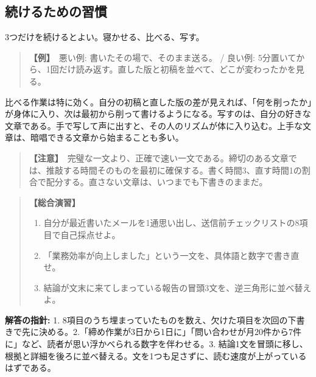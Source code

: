 \documentclass{article}
\begin{document}
\subsection{続けるための習慣}

3つだけを続けるとよい。寝かせる、比べる、写す。

\begin{quote}
\textbf{【例】}\ 悪い例: 書いたその場で、そのまま送る。 / 良い例: 5分置いてから、1回だけ読み返す。直した版と初稿を並べて、どこが変わったかを見る。
\end{quote}

比べる作業は特に効く。自分の初稿と直した版の差が見えれば、「何を削ったか」が身体に入り、次は最初から削って書けるようになる。写すのは、自分の好きな文章である。手で写して声に出すと、その人のリズムが体に入り込む。上手な文章は、暗唱できる文章から始まることも多い。

\begin{quote}
\textbf{【注意】}\ 完璧な一文より、正確で速い一文である。締切のある文章では、推敲する時間そのものを最初に確保する。書く時間3、直す時間1の割合で配分する。直さない文章は、いつまでも下書きのままだ。
\end{quote}

\begin{quote}
\textbf{【総合演習】}
\begin{enumerate}
\item 自分が最近書いたメールを1通思い出し、送信前チェックリストの8項目で自己採点せよ。
\item 「業務効率が向上しました」という一文を、具体語と数字で書き直せ。
\item 結論が文末に来てしまっている報告の冒頭3文を、逆三角形に並べ替えよ。
\end{enumerate}
\end{quote}

\textbf{解答の指針:} 1. 8項目のうち埋まっていたものを数え、欠けた項目を次回の下書きで先に決める。2.「締め作業が3日から1日に」「問い合わせが月20件から7件に」など、読者が思い浮かべられる数字を伴わせる。3. 結論1文を冒頭に移し、根拠と詳細を後ろに並べ替える。文を1つも足さずに、読む速度が上がっているはずである。
\end{document}
